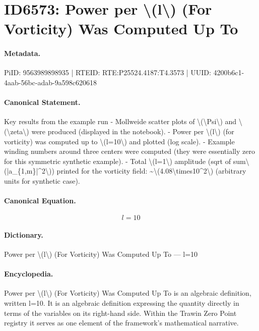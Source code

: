 \section*{ID6573: Power per \textbackslash{}(l\textbackslash{}) (For Vorticity) Was Computed Up To}
\paragraph{Metadata.}
PiID: 9563989898935 | RTEID: RTE:P25524.4187:T4.3573 | UUID: 4200b6c1-4aab-56bc-adab-9a598c620618

\paragraph{Canonical Statement.}
Key results from the example run - Mollweide scatter plots of \textbackslash{}(\textbackslash{}Psi\textbackslash{}) and \textbackslash{}(\textbackslash{}zeta\textbackslash{}) were produced (displayed in the notebook). - Power per \textbackslash{}(l\textbackslash{}) (for vorticity) was computed up to \textbackslash{}(l=10\textbackslash{}) and plotted (log scale). - Example winding numbers around three centers were computed (they were essentially zero for this symmetric synthetic example). - Total \textbackslash{}(l=1\textbackslash{}) amplitude (sqrt of sum\textbackslash{}(|a\_\{1,m\}|\textasciicircum{}2\textbackslash{})) printed for the vorticity field: \textasciitilde{}\textbackslash{}(4.08\textbackslash{}times10\textasciicircum{}2\textbackslash{}) (arbitrary units for synthetic case).

\paragraph{Canonical Equation.}
\[
l=10
\]

\paragraph{Dictionary.}
Power per \textbackslash{}(l\textbackslash{}) (For Vorticity) Was Computed Up To — l=10

\paragraph{Encyclopedia.}
Power per \textbackslash{}(l\textbackslash{}) (For Vorticity) Was Computed Up To is an algebraic definition, written l=10. It is an algebraic definition expressing the quantity directly in terms of the variables on its right-hand side. Within the Trawin Zero Point registry it serves as one element of the framework's mathematical narrative.
